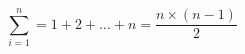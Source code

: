 \documentclass[varwidth,preview]{standalone}
\begin{document}
\[
    \sum_{i = 1}^{n} = 1 + 2 + \dots + n = \frac{n \times (n - 1)}{2}
\]
\end{document}
